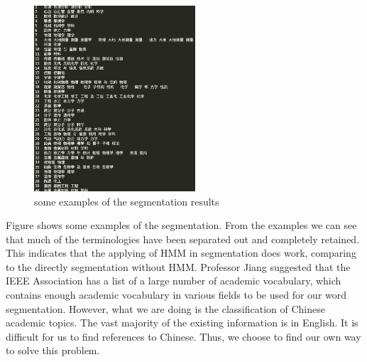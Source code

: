 \documentclass{acmtog} %
\begin{document}
\begin{figure}[h]
\centerline{\includegraphics[width=6cm]{Figure 2.png}}
\caption{some examples of the segmentation results}
  \label{fig:videocomparison}
\end{figure}


Figure shows some examples of the segmentation. From the examples we can see that much of the terminologies have been separated out and completely retained. This indicates that the applying of HMM in segmentation does work, comparing to the directly segmentation without HMM.
Professor Jiang suggested that the IEEE Association has a list of a large number of academic vocabulary, which contains enough academic vocabulary in various fields to be used for our word segmentation. However, what we are doing is the classification of Chinese academic topics. The vast majority of the existing information is in English. It is difficult for us to find references to Chinese. Thus, we choose to find our own way to solve this problem.
\end{document}
